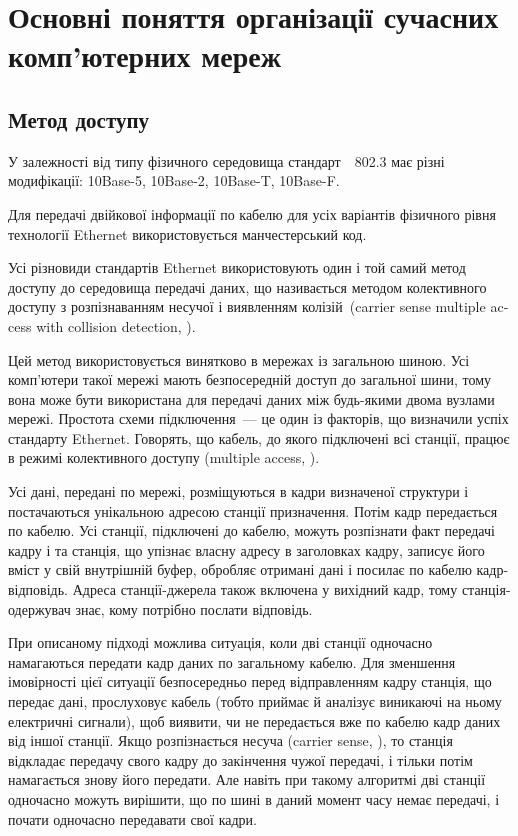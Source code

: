 \documentclass[
  ukrainian,
  simple,
  floatsection,
]{eskdnaukvd}
\begin{document}
  \clearpage
  \section{Основні поняття організації сучасних комп'ютерних мереж}
    \subsection{Метод доступу~\textenglish{}}
      У залежності від типу фізичного середовища стандарт~\textenglish{}~802.3 має різні модифікації: \textenglish{10Base-5, 10Base-2, 10Base-T, 10Base-F}.

      Для передачі двійкової інформації по кабелю для усіх варіантів фізичного рівня технології \textenglish{Ethernet} використовується манчестерський код.

      Усі різновиди стандартів \textenglish{Ethernet} використовують один і той самий метод доступу до середовища передачі даних, що називається методом колективного доступу з розпізнаванням несучої і виявленням колізій~(\textenglish{carrier sense multiple access with collision detection, }).

      Цей метод використовується винятково в мережах із загальною шиною. Усі комп'ютери такої мережі мають безпосередній доступ до загальної шини, тому вона може бути використана для передачі даних між будь-якими двома вузлами мережі. Простота схеми підключення~— це один із факторів, що визначили успіх стандарту \textenglish{Ethernet}. Говорять, що кабель, до якого підключені всі станції, працює в режимі колективного доступу (\textenglish{multiple access, }).

      Усі дані, передані по мережі, розміщуються в кадри визначеної структури і постачаються унікальною адресою станції призначення. Потім кадр передається по кабелю. Усі станції, підключені до кабелю, можуть розпізнати факт передачі кадру і та станція, що упізнає власну адресу в заголовках кадру, записує його вміст у свій внутрішній буфер, обробляє отримані дані і посилає по кабелю кадр-відповідь. Адреса станції-джерела також включена у вихідний кадр, тому станція-одержувач знає, кому потрібно послати відповідь.

      При описаному підході можлива ситуація, коли дві станції одночасно намагаються передати кадр даних по загальному кабелю. Для зменшення імовірності цієї ситуації безпосередньо перед відправленням кадру станція, що передає дані, прослуховує кабель (тобто приймає й аналізує виникаючі на ньому електричні сигнали), щоб виявити, чи не передається вже по кабелю кадр даних від іншої станції. Якщо розпізнається несуча (\textenglish{carrier sense, }), то станція відкладає передачу свого кадру до закінчення чужої передачі, і тільки потім намагається знову його передати.  Але навіть при такому алгоритмі дві станції одночасно можуть вирішити, що по шині в даний момент часу немає передачі, і почати одночасно передавати свої кадри.
\end{document}
